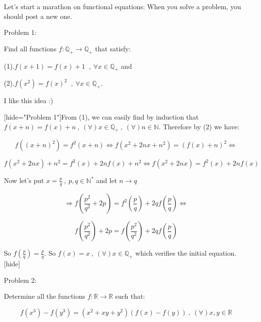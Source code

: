 \begin{solution}
	\begin{tcolorbox}Let's start a marathon on functional equations:
When you solve a problem, you should post a new one.

\begin{bolded}Problem 1:\end{bolded} Find all functions $f: \mathbb{Q}_{+} \rightarrow \mathbb{Q}_{+}$ that satisfy:

(1).$f(x+1)=f(x)+1$ $\ ,\ \forall x \in \mathbb{Q}_{+}$ and

(2).$f(x^2) = f(x)^2$ $\ ,\ \forall x \in \mathbb{Q}_{+}$.\end{tcolorbox}

I like this idea :)

[hide="Problem 1"]From (1), we can easily find by induction that $f(x+n)=f(x)+n\ ,\ (\forall)x\in \mathbb{Q}_+\ ,\ (\forall)n\in \mathbb{N}$. Therefore by (2) we have:

\[f((x+n)^2)=f^2(x+n)\Leftrightarrow f(x^2+2nx+n^2)=(f(x)+n)^2\Leftrightarrow\]

\[ f(x^2+2nx)+n^2=f^2(x)+2nf(x)+n^2\Leftrightarrow f(x^2+2nx)=f^2(x)+2nf(x)\]

Now let's put $x=\displaystyle\frac{p}{q}\ ,\ p,q\in \mathbb{N}^*$ and let $n\rightarrow q$

\[\Rightarrow f\left(\frac{p^2}{q^2}+2p\right)=f^2\left(\frac{p}{q}\right)+2qf\left(\frac{p}{q}\right)\Leftrightarrow \]

\[f\left(\frac{p^2}{q^2}\right)+2p=f\left(\frac{p^2}{q^2}\right)+2qf\left(\frac{p}{q}\right)\]

So $f\left(\displaystyle\frac{p}{q}\right)=\displaystyle\frac{p}{q}$. So $f(x)=x\ ,\ (\forall)x\in \mathbb{Q}_+$ which verifies the initial equation.[\/hide]

\begin{bolded}Problem 2:\end{bolded} Determine all the functions $f:\mathbb{R}\rightarrow \mathbb{R}$ such that:

\[f(x^3)-f(y^3)=(x^2+xy+y^2)(f(x)-f(y))\ ,\ (\forall)x,y\in \mathbb{R}\]
\end{solution}




